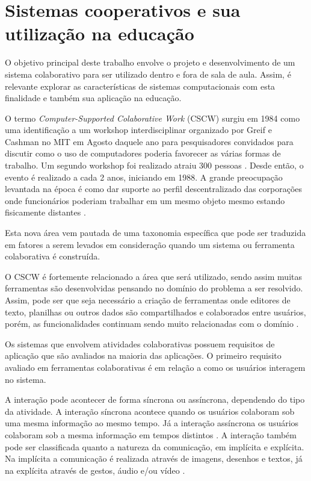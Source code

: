 \section{Sistemas cooperativos e sua utilização na educação}


O objetivo principal deste trabalho envolve o projeto e desenvolvimento de um sistema colaborativo para ser utilizado dentro e fora de sala de aula. Assim, é relevante explorar as características de sistemas computacionais com esta finalidade e também sua aplicação na educação.

O termo \emph{Computer-Supported Colaborative Work} (CSCW) surgiu em 1984 como uma identificação a um workshop interdisciplinar organizado por Greif e Cashman no MIT em Agosto daquele ano para pesquisadores convidados para discutir como o uso de computadores poderia favorecer as várias formas de trabalho. Um segundo workshop foi realizado atraiu 300 pessoas \cite{greif1988}. Desde então, o evento é realizado a cada 2 anos, iniciando em 1988. A grande preocupação levantada na época é como dar suporte ao perfil descentralizado das corporações onde funcionários poderiam trabalhar em um mesmo objeto mesmo estando fisicamente distantes \cite{reinhard_cscw_1994}.

Esta nova área vem pautada de uma taxonomia específica que pode ser traduzida em fatores a serem levados em consideração quando um sistema ou ferramenta colaborativa é construída.

O CSCW é fortemente relacionado a área que será utilizado, sendo assim muitas ferramentas são desenvolvidas pensando no domínio do problema a ser resolvido. Assim, pode ser que seja necessário a criação de ferramentas onde editores de texto, planilhas ou outros dados são compartilhados e colaborados entre usuários, porém, as funcionalidades continuam sendo muito relacionadas com o domínio \cite{reinhard_cscw_1994}.

Os sistemas que envolvem atividades colaborativas possuem requisitos de aplicação que são avaliados na maioria das aplicações. O primeiro requisito avaliado em ferramentas colaborativas é em relação a como os usuários interagem no sistema.

A interação pode acontecer de forma síncrona ou assíncrona, dependendo do tipo da atividade. A interação síncrona acontece quando os usuários colaboram sob uma mesma informação ao mesmo tempo. Já a interação assíncrona os usuários colaboram sob a mesma informação em tempos distintos \cite{reinhard_cscw_1994}. A interação também pode ser classificada quanto a natureza da comunicação, em implícita e explícita. Na implícita a comunicação é realizada através de imagens, desenhos e textos, já na explícita através de gestos, áudio e/ou vídeo \cite{schmidt_taking_1992}.

